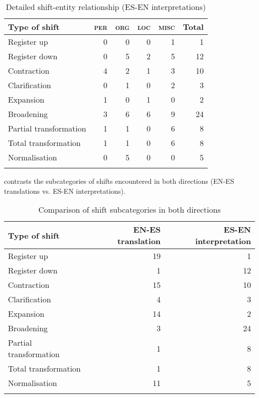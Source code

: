\documentclass[output=paper]{langscibook}
\begin{document}
\begin{table}
\begin{tabularx}{\textwidth}{Qrrrrr}

\lsptoprule

{\bfseries Type of shift} & {\bfseries \textsc{per}} & {\bfseries \textsc{org}} & {\bfseries \textsc{loc}} & {\bfseries \textsc{misc}} & {\bfseries Total}\\
\midrule
Register up & 0 & 0 & 0 & 1 & 1\\
Register down & 0 & 5 & 2 & 5 & 12\\
Contraction & 4 & 2 & 1 & 3 & 10\\
Clarification & 0 & 1 & 0 & 2 & 3\\
Expansion & 1 & 0 & 1 & 0 & 2\\
Broadening & 3 & 6 & 6 & 9 & 24\\
Partial transformation & 1 & 1 & 0 & 6 & 8\\
Total transformation & 1 & 1 & 0 & 6 & 8\\
Normalisation & 0 & 5 & 0 & 0 & 5\\
\lspbottomrule
\end{tabularx}
\caption{
Detailed shift-entity relationship (ES-EN interpretations)
}
\label{tab:corpas:9}
\end{table}

 contrasts the subcategories of shifts encountered in both directions (EN-ES translations vs. ES-EN interpretations).

\begin{table}
\begin{tabularx}{\textwidth}{Qrr}

\lsptoprule

{\bfseries Type of shift} & {\bfseries EN-ES translation} & {\bfseries ES-EN interpretation}\\
\midrule
Register up & 19 & 1\\
Register down & 1 & 12\\
Contraction & 15 & 10\\
Clarification & 4 & 3\\
Expansion & 14 & 2\\
Broadening & 3 & 24\\
Partial transformation & 1 & 8\\
Total transformation & 1 & 8\\
Normalisation & 11 & 5\\
\lspbottomrule
\end{tabularx}
\caption{
Comparison of shift subcategories in both directions
}
\label{tab:corpas:10}
\end{table}
\end{document}
